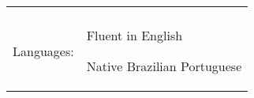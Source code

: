 \documentclass[a4paper,12pt]{article}
\begin{document}
\begin{tabular}{rp{15.2cm}}
\begin{itemize*}[label=\Large\textbullet]
\end{itemize*}\\
\raggedleft Languages:
& \begin{itemize*}[label=\Large\textbullet]
    \item Fluent in English
    \item Native Brazilian Portuguese
\end{itemize*}\\
\end{tabular}
\end{document}
